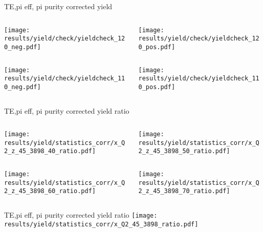 \begin{frame}{TE,pi eff, pi purity corrected yield}
\begin{columns}
\begin{column}[T]{0.5\textwidth}
\texttt{[image: results/yield/check/yieldcheck\_120\_neg.pdf]}
\end{column}
\begin{column}[T]{0.5\textwidth}
\texttt{[image: results/yield/check/yieldcheck\_120\_pos.pdf]}
\end{column}
\end{columns}
\begin{columns}
\begin{column}[T]{0.5\textwidth}
\texttt{[image: results/yield/check/yieldcheck\_110\_neg.pdf]}
\end{column}
\begin{column}[T]{0.5\textwidth}
\texttt{[image: results/yield/check/yieldcheck\_110\_pos.pdf]}
\end{column}
\end{columns}
\end{frame}
\begin{frame}{TE,pi eff, pi purity corrected yield ratio}
\begin{columns}
\begin{column}[T]{0.5\textwidth}
\texttt{[image: results/yield/statistics\_corr/x\_Q2\_z\_45\_3898\_40\_ratio.pdf]}
\end{column}
\begin{column}[T]{0.5\textwidth}
\texttt{[image: results/yield/statistics\_corr/x\_Q2\_z\_45\_3898\_50\_ratio.pdf]}
\end{column}
\end{columns}
\begin{columns}
\begin{column}[T]{0.5\textwidth}
\texttt{[image: results/yield/statistics\_corr/x\_Q2\_z\_45\_3898\_60\_ratio.pdf]}
\end{column}
\begin{column}[T]{0.5\textwidth}
\texttt{[image: results/yield/statistics\_corr/x\_Q2\_z\_45\_3898\_70\_ratio.pdf]}
\end{column}
\end{columns}
\end{frame}
\begin{frame}{TE,pi eff, pi purity corrected yield ratio}
\texttt{[image: results/yield/statistics\_corr/x\_Q2\_45\_3898\_ratio.pdf]}
\end{frame}
